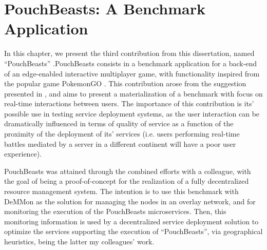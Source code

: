 

\chapter{PouchBeasts: A Benchmark Application}
\label{cha:benchmark}

In this chapter, we present the third contribution from this dissertation, named ``PouchBeasts'' .PouchBeasts consists in a benchmark application for a back-end of an edge-enabled interactive multiplayer game, with functionality inspired from the popular game PokemonGO . This contribution arose from the suggestion presented in , and aims to present a materialization of a benchmark with focus on real-time interactions between users. The importance of this contribution is its' possible use in testing service deployment systems, as the user interaction can be dramatically influenced in terms of quality of service as a function of the proximity of the deployment of its' services (i.e. users performing real-time battles mediated by a server in a different continent will have a poor user experience).


PouchBeasts was attained through the combined efforts with a colleague, with the goal of being a proof-of-concept for the realization of a fully decentralized resource management system. The intention is to use this benchmark with DeMMon as the solution for managing the nodes in an overlay network, and for monitoring the execution of the PouchBeasts microservices. Then, this monitoring information is used by a decentralized service deployment solution to optimize the services supporting the execution of ``PouchBeasts'', via geographical heuristics, being the latter my colleagues' work.

